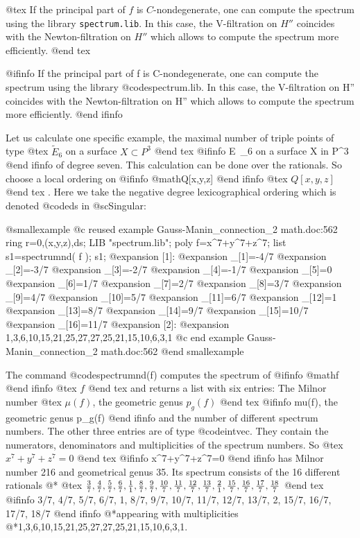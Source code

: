 @tex
If the principal part of $f$ is $C$-nondegenerate, one can compute the spectrum using the library {\tt spectrum.lib}.
In this case, the V-filtration on $H''$ coincides with the Newton-filtration on $H''$ which allows to compute the spectrum more efficiently.
@end tex

@ifinfo
If the principal part of f is C-nondegenerate, one can compute the spectrum using the library @code{spectrum.lib}.
In this case, the V-filtration on H'' coincides with the Newton-filtration on H'' which allows to compute the spectrum more efficiently.
@end ifinfo

Let us calculate one specific example, the maximal number 
of triple points of type
@tex
$\tilde{E}_6$ on a surface $X\subset{P}^3$
@end tex
@ifinfo
E~_6 on a surface X in P^3
@end ifinfo
of degree seven.
This calculation can be done over the rationals.
So choose a local ordering on 
@ifinfo
@math{Q[x,y,z]}
@end ifinfo
@tex
$Q[x,y,z]$
@end tex
. Here we take the
negative degree lexicographical ordering which is denoted
@code{ds} in @sc{Singular}:

@smallexample
@c reused example Gauss-Manin_connection_2 math.doc:562 
ring r=0,(x,y,z),ds;
LIB "spectrum.lib";
poly f=x^7+y^7+z^7;
list s1=spectrumnd( f );
s1;
@expansion{} [1]:
@expansion{}    _[1]=-4/7
@expansion{}    _[2]=-3/7
@expansion{}    _[3]=-2/7
@expansion{}    _[4]=-1/7
@expansion{}    _[5]=0
@expansion{}    _[6]=1/7
@expansion{}    _[7]=2/7
@expansion{}    _[8]=3/7
@expansion{}    _[9]=4/7
@expansion{}    _[10]=5/7
@expansion{}    _[11]=6/7
@expansion{}    _[12]=1
@expansion{}    _[13]=8/7
@expansion{}    _[14]=9/7
@expansion{}    _[15]=10/7
@expansion{}    _[16]=11/7
@expansion{} [2]:
@expansion{}    1,3,6,10,15,21,25,27,27,25,21,15,10,6,3,1
@c end example Gauss-Manin_connection_2 math.doc:562
@end smallexample

The command @code{spectrumnd(f)} computes the spectrum of 
@ifinfo
@math{f}
@end ifinfo
@tex
$f$
@end tex
 and
returns a list with six entries:
The Milnor number
@tex
$\mu(f)$, the geometric genus $p_g(f)$
@end tex
@ifinfo
mu(f), the geometric genus p_g(f)
@end ifinfo
and the number of different spectrum numbers.
The other three entries are of type @code{intvec}.
They contain the numerators, denominators and
multiplicities of the spectrum numbers. So
@tex
$x^7+y^7+z^7=0$
@end tex
@ifinfo
x^7+y^7+z^7=0
@end ifinfo
has Milnor number 216 and geometrical
genus 35. Its spectrum consists of the 16 different rationals
@*
@tex
${3 \over 7}, {4 \over 7}, {5 \over 7}, {6 \over 7}, {1 \over 1},
{8 \over 7}, {9 \over 7}, {10 \over 7}, {11 \over 7}, {12 \over 7},
{13 \over 7}, {2 \over 1}, {15 \over 7}, {16 \over 7}, {17 \over 7},
{18 \over 7}$
@end tex
@ifinfo
3/7, 4/7, 5/7, 6/7, 1, 8/7, 9/7, 10/7, 11/7, 12/7, 13/7, 2, 15/7, 16/7, 17/7, 
18/7
@end ifinfo
@*appearing with multiplicities
@*1,3,6,10,15,21,25,27,27,25,21,15,10,6,3,1.

